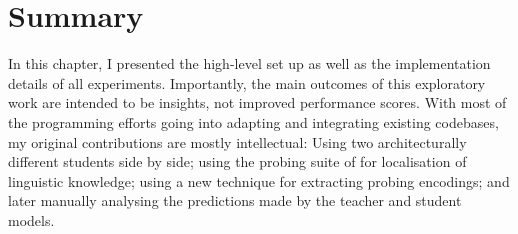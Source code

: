 \documentclass[bsc,frontabs,singlespacing,parskip,deptreport]{infthesis}
\begin{document}
{  \section{Summary}{
    In this chapter, I presented the high-level set up as well as the implementation details of all experiments.
    Importantly, the main outcomes of this exploratory work are intended to be insights, not improved performance scores.
    With most of the programming efforts going into adapting and integrating existing codebases, my original contributions are mostly intellectual: 
    Using two architecturally different students side by side; 
    using the probing suite of \citet{Conneau_2018} for localisation of linguistic knowledge;
    using a new technique for extracting probing encodings; 
    and later manually analysing the predictions made by the teacher and student models.
  }
}
\end{document}
